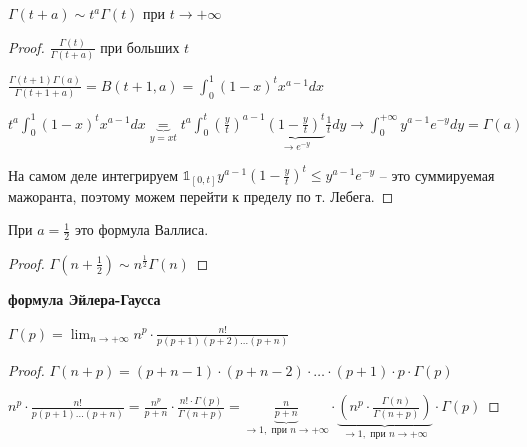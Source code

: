 \begin{theorem}
    $\Gamma(t + a) \sim t^a \Gamma(t)$ при $t \to +\infty$
\end{theorem}

\begin{proof}
    $\frac{\Gamma(t)}{\Gamma(t + a)}$ при больших $t$

    $\frac{\Gamma(t + 1)\Gamma(a)}{\Gamma(t + 1 + a)} = B(t + 1, a) = \int_{0}^{1}(1 - x)^tx^{a - 1}dx$

    $t^a\int_{0}^{1}(1 - x)^tx^{a - 1}dx \underbrace{=}_{y = xt} t^a \int_{0}^{t} {\left(\frac{y}{t}\right)^{a - 1} \underbrace{\left(1 - \frac{y}{t}\right)^t}_{\to e^{-y}} \frac{1}{t} dy} \to \int_{0}^{+\infty}y^{a-1}e^{-y}dy = \Gamma(a)$

    На самом деле интегрируем $\mathds{1}_{[0, t]}y^{a-1}(1 - \frac{y}{t})^t \leq y^{a-1}e^{-y}$ -- это суммируемая мажоранта, поэтому можем перейти к пределу по т. Лебега.
\end{proof}

\begin{consequence}
    При $a = \frac{1}{2}$ это формула Валлиса.
\end{consequence}

\begin{proof}
    $\Gamma(n + \frac{1}{2}) \sim n^{\frac{1}{2}}\Gamma(n)$
\end{proof}

\begin{theorem}\textbf{формула Эйлера-Гаусса}
    
    $\Gamma(p) = \lim_{n \rightarrow +\infty} n^p \cdot \frac{n!}{p(p + 1)(p + 2)\dots (p + n)}$

\end{theorem}

\begin{proof}

    $\Gamma(n + p) = (p + n - 1) \cdot (p + n - 2) \cdot \dots \cdot (p+1) \cdot p \cdot \Gamma(p)$

    $n^p \cdot \frac{n!}{p (p + 1) \dots (p + n)} = \frac{n^p}{p + n} \cdot \frac{n! \cdot \Gamma(p)}{\Gamma(n + p)} = \underbrace{\frac{n}{p + n}}_{\rightarrow 1, \text{ при } n \rightarrow +\infty} \cdot \underbrace{\left(n^p \cdot \frac{\Gamma(n)}{\Gamma(n + p)}\right)}_{\rightarrow 1, \text{ при } n \rightarrow +\infty} \cdot \Gamma(p)$
\end{proof}

